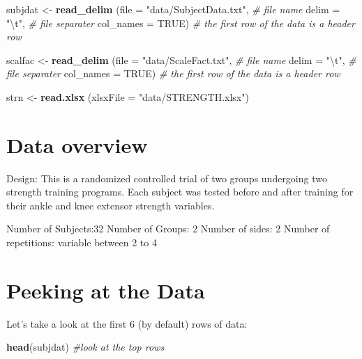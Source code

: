 \documentclass[
]{book}
\newenvironment{Shaded}{\begin{snugshade}}{\end{snugshade}}
\newcommand{\CharTok}[1]{\textcolor[rgb]{0.31,0.60,0.02}{#1}}
\newcommand{\CommentTok}[1]{\textcolor[rgb]{0.56,0.35,0.01}{\textit{#1}}}
\newcommand{\DataTypeTok}[1]{\textcolor[rgb]{0.13,0.29,0.53}{#1}}
\newcommand{\KeywordTok}[1]{\textcolor[rgb]{0.13,0.29,0.53}{\textbf{#1}}}
\newcommand{\NormalTok}[1]{#1}
\newcommand{\OtherTok}[1]{\textcolor[rgb]{0.56,0.35,0.01}{#1}}
\newcommand{\StringTok}[1]{\textcolor[rgb]{0.31,0.60,0.02}{#1}}
\begin{document}
\begin{Shaded}
\begin{Highlighting}[]
\NormalTok{subjdat <-}\StringTok{  }\KeywordTok{read_delim}\NormalTok{ (}\DataTypeTok{file =} \StringTok{"data/SubjectData.txt"}\NormalTok{, }\CommentTok{# file name}
                        \DataTypeTok{delim =} \StringTok{"}\CharTok{\textbackslash{}t}\StringTok{"}\NormalTok{, }\CommentTok{# file separater}
                        \DataTypeTok{col_names =} \OtherTok{TRUE}\NormalTok{) }\CommentTok{# the first row of the data is a header row}

\NormalTok{scalfac <-}\StringTok{  }\KeywordTok{read_delim}\NormalTok{ (}\DataTypeTok{file =} \StringTok{"data/ScaleFact.txt"}\NormalTok{, }\CommentTok{# file name}
                        \DataTypeTok{delim =} \StringTok{"}\CharTok{\textbackslash{}t}\StringTok{"}\NormalTok{, }\CommentTok{# file separater}
                        \DataTypeTok{col_names =} \OtherTok{TRUE}\NormalTok{) }\CommentTok{# the first row of the data is a header row}

\NormalTok{strn <-}\StringTok{  }\KeywordTok{read.xlsx}\NormalTok{ (}\DataTypeTok{xlsxFile =} \StringTok{"data/STRENGTH.xlsx"}\NormalTok{)}
\end{Highlighting}
\end{Shaded}

\hypertarget{data-overview}{%
\section*{Data overview}\label{data-overview}}

Design: This is a randomized controlled trial of two groups undergoing two strength training programs. Each subject was tested before and after training for their ankle and knee extensor strength variables.

Number of Subjects:32
Number of Groups: 2
Number of sides: 2
Number of repetitions: variable between 2 to 4

\hypertarget{peeking-at-the-data}{%
\section{Peeking at the Data}\label{peeking-at-the-data}}

Let's take a look at the first 6 (by default) rows of data:

\begin{Shaded}
\begin{Highlighting}[]
\KeywordTok{head}\NormalTok{(subjdat) }\CommentTok{#look at the top rows}
\end{Highlighting}
\end{Shaded}
\end{document}
